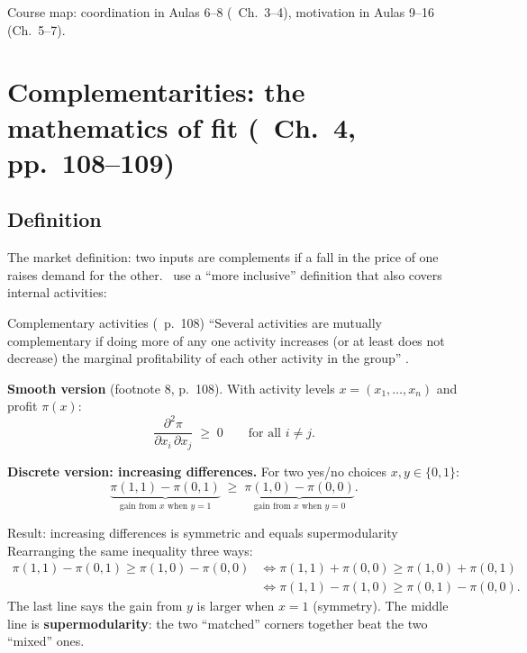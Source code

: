 Course map: coordination in Aulas 6--8 (\MR\ Ch.~3--4), motivation in Aulas 9--16 (Ch.~5--7).

\section{Complementarities: the mathematics of fit (\MR\ Ch.~4, pp.~108--109)}
\label{sec:a1-compl}

\subsection{Definition}\label{sec:a1-def}

The market definition: two inputs are complements if a fall in the price of one raises demand for
the other. \MR\ use a ``more inclusive'' definition that also covers internal activities:

\begin{defn}{Complementary activities (\MR\ p.~108)}
``Several activities are mutually complementary if doing more of any one activity increases (or at
least does not decrease) the marginal profitability of each other activity in the group''
.

\textbf{Smooth version} (footnote 8, p.~108). With activity levels $x = (x_1, \dots, x_n)$ and
profit $\pi(x)$:
\[
  \frac{\partial^2 \pi}{\partial x_i \, \partial x_j} \;\ge\; 0 \qquad \text{for all } i \ne j .
\]

\textbf{Discrete version: increasing differences.} For two yes/no choices $x, y \in \{0, 1\}$:
\[
  \underbrace{\pi(1,1) - \pi(0,1)}_{\text{gain from } x \text{ when } y = 1} \;\ge\;
  \underbrace{\pi(1,0) - \pi(0,0)}_{\text{gain from } x \text{ when } y = 0}.
\]
\end{defn}

\begin{prop}{Result: increasing differences is symmetric and equals supermodularity}
Rearranging the same inequality three ways:
\begin{align*}
  \pi(1,1) - \pi(0,1) \ge \pi(1,0) - \pi(0,0)
  &\iff \pi(1,1) + \pi(0,0) \ge \pi(1,0) + \pi(0,1) \\
  &\iff \pi(1,1) - \pi(1,0) \ge \pi(0,1) - \pi(0,0).
\end{align*}
The last line says the gain from $y$ is larger when $x = 1$ (symmetry). The middle line is
\textbf{supermodularity}: the two ``matched'' corners together beat the two ``mixed'' ones.
\end{prop}

